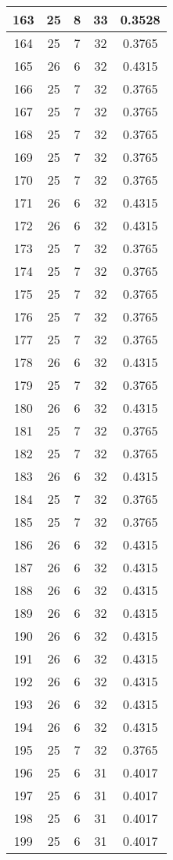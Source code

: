 \documentclass[letterpaper, 12pt]{article}
\begin{document}
\begin{longtable}{|c|c|c|c|c|}
\hline
163 & 25 & 8 & 33 & 0.3528 \\
\hline
164 & 25 & 7 & 32 & 0.3765 \\
\hline
165 & 26 & 6 & 32 & 0.4315 \\
\hline
166 & 25 & 7 & 32 & 0.3765 \\
\hline
167 & 25 & 7 & 32 & 0.3765 \\
\hline
168 & 25 & 7 & 32 & 0.3765 \\
\hline
169 & 25 & 7 & 32 & 0.3765 \\
\hline
170 & 25 & 7 & 32 & 0.3765 \\
\hline
171 & 26 & 6 & 32 & 0.4315 \\
\hline
172 & 26 & 6 & 32 & 0.4315 \\
\hline
173 & 25 & 7 & 32 & 0.3765 \\
\hline
174 & 25 & 7 & 32 & 0.3765 \\
\hline
175 & 25 & 7 & 32 & 0.3765 \\
\hline
176 & 25 & 7 & 32 & 0.3765 \\
\hline
177 & 25 & 7 & 32 & 0.3765 \\
\hline
178 & 26 & 6 & 32 & 0.4315 \\
\hline
179 & 25 & 7 & 32 & 0.3765 \\
\hline
180 & 26 & 6 & 32 & 0.4315 \\
\hline
181 & 25 & 7 & 32 & 0.3765 \\
\hline
182 & 25 & 7 & 32 & 0.3765 \\
\hline
183 & 26 & 6 & 32 & 0.4315 \\
\hline
184 & 25 & 7 & 32 & 0.3765 \\
\hline
185 & 25 & 7 & 32 & 0.3765 \\
\hline
186 & 26 & 6 & 32 & 0.4315 \\
\hline
187 & 26 & 6 & 32 & 0.4315 \\
\hline
188 & 26 & 6 & 32 & 0.4315 \\
\hline
189 & 26 & 6 & 32 & 0.4315 \\
\hline
190 & 26 & 6 & 32 & 0.4315 \\
\hline
191 & 26 & 6 & 32 & 0.4315 \\
\hline
192 & 26 & 6 & 32 & 0.4315 \\
\hline
193 & 26 & 6 & 32 & 0.4315 \\
\hline
194 & 26 & 6 & 32 & 0.4315 \\
\hline
195 & 25 & 7 & 32 & 0.3765 \\
\hline
196 & 25 & 6 & 31 & 0.4017 \\
\hline
197 & 25 & 6 & 31 & 0.4017 \\
\hline
198 & 25 & 6 & 31 & 0.4017 \\
\hline
199 & 25 & 6 & 31 & 0.4017 \\
\hline
\end{longtable}
\end{document}
